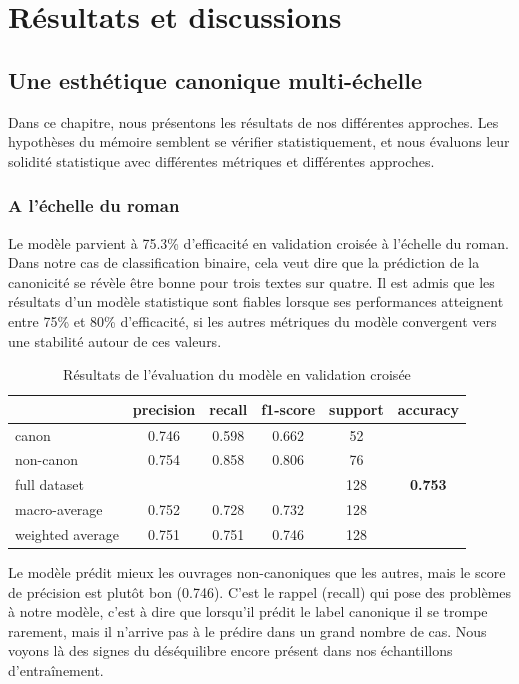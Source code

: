 \part{Résultats et discussions}

\chapter{Une esthétique canonique multi-échelle}

Dans ce chapitre, nous présentons les résultats de nos différentes approches. Les hypothèses du mémoire semblent se vérifier statistiquement, et nous évaluons leur solidité statistique avec différentes métriques et différentes approches. 

\section{A l'échelle du roman}

Le modèle parvient à 75.3\% d'efficacité en validation croisée à l'échelle du roman. Dans notre cas de classification binaire, cela veut dire que la prédiction de la canonicité se révèle être bonne pour trois textes sur quatre. Il est admis que les résultats d'un modèle statistique sont fiables lorsque ses performances atteignent entre 75\% et 80\% d'efficacité, si les autres métriques du modèle convergent vers une stabilité autour de ces valeurs.

	\begin{table}[ht]
		\centering %
		\begin{tabular}{l c c c c c}
			\toprule
    			 & precision & recall & f1-score & support & accuracy \\
			\toprule
			canon & 0.746 & 0.598 & 0.662 & 52 \\
			\midrule
			non-canon & 0.754 & 0.858 & 0.806 & 76\\
			\midrule
			full dataset & & & & 128 &\textbf{0.753} \\
			\midrule
			macro-average & 0.752 & 0.728 & 0.732 & 128\\
			\midrule
			weighted average & 0.751 & 0.751 & 0.746 & 128\\

			\bottomrule
		\end{tabular}
	\caption{Résultats de l'évaluation du modèle en validation croisée}
	\end{table} 
Le modèle prédit mieux les ouvrages non-canoniques que les autres, mais le score de précision est plutôt bon (0.746). C'est le rappel (recall) qui pose des problèmes à notre modèle, c'est à dire que lorsqu'il prédit le label canonique il se trompe rarement, mais il n'arrive pas à le prédire dans un grand nombre de cas. Nous voyons là des signes du déséquilibre encore présent dans nos échantillons d'entraînement. 

